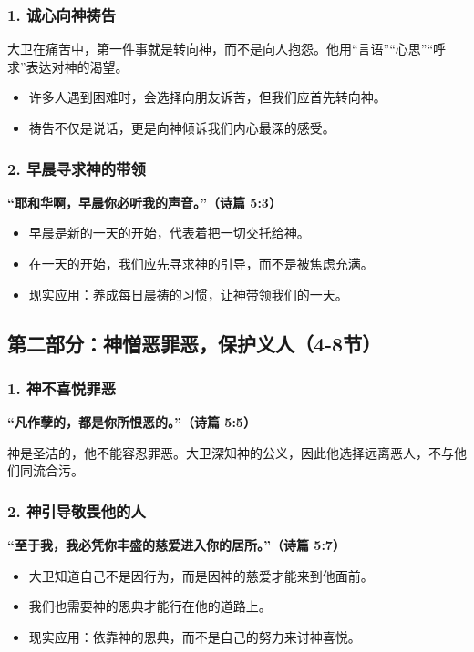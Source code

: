 \documentclass[a4paper, 12pt]{article}
\begin{document}
\subsubsection*{1. 诚心向神祷告}
大卫在痛苦中，第一件事就是转向神，而不是向人抱怨。他用“言语”“心思”“呼求”表达对神的渴望。
\begin{itemize}
    \item 许多人遇到困难时，会选择向朋友诉苦，但我们应首先转向神。
    \item 祷告不仅是说话，更是向神倾诉我们内心最深的感受。
\end{itemize}

\subsubsection*{2. 早晨寻求神的带领}
\textbf{“耶和华啊，早晨你必听我的声音。”（诗篇 5:3）}

\begin{itemize}
    \item 早晨是新的一天的开始，代表着把一切交托给神。
    \item 在一天的开始，我们应先寻求神的引导，而不是被焦虑充满。
    \item 现实应用：养成每日晨祷的习惯，让神带领我们的一天。
\end{itemize}

\subsection*{第二部分：神憎恶罪恶，保护义人（4-8节）}

\subsubsection*{1. 神不喜悦罪恶}
\textbf{“凡作孽的，都是你所恨恶的。”（诗篇 5:5）}

神是圣洁的，他不能容忍罪恶。大卫深知神的公义，因此他选择远离恶人，不与他们同流合污。

\subsubsection*{2. 神引导敬畏他的人}
\textbf{“至于我，我必凭你丰盛的慈爱进入你的居所。”（诗篇 5:7）}

\begin{itemize}
    \item 大卫知道自己不是因行为，而是因神的慈爱才能来到他面前。
    \item 我们也需要神的恩典才能行在他的道路上。
    \item 现实应用：依靠神的恩典，而不是自己的努力来讨神喜悦。
\end{itemize}
\end{document}
